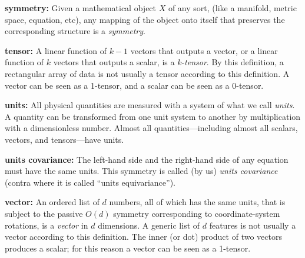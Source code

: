 \documentclass{article}
\theoremstyle{plain}
\theoremstyle{definition}
\theoremstyle{remark}
\begin{document}
\textbf{symmetry:}
Given a mathematical object $X$ of any sort, (like a manifold, metric space, equation, etc), any mapping of the object onto itself that preserves the corresponding structure is a \emph{symmetry}.

\textbf{tensor:}
A linear function of $k-1$ vectors that outputs a vector, or a linear function of $k$ vectors that outputs a scalar, is a $k$-\emph{tensor}.
By this definition, a rectangular array of data is not usually a tensor according to this definition.
A vector can be seen as a 1-tensor, and a scalar can be seen as a 0-tensor.

\textbf{units:}
All physical quantities are measured with a system of what we call \emph{units}.
A quantity can be transformed from one unit system to another by multiplication with a dimensionless number.
Almost all quantities---including almost all scalars, vectors, and tensors---have units.

\textbf{units covariance:}
The left-hand side and the right-hand side of any equation must have the same units.
This symmetry is called (by us) \emph{units covariance} (contra \citealt{villar2022dimensionless} where it is called ``units equivariance'').

\textbf{vector:}
An ordered list of $d$ numbers, all of which has the same units, that is subject to the passive $O(d)$ symmetry corresponding to coordinate-system rotations, is a \emph{vector} in $d$ dimensions.
A generic list of $d$ features is not usually a vector according to this definition.
The inner (or dot) product of two vectors produces a scalar; for this reason a vector can be seen as a 1-tensor.
\end{document}
